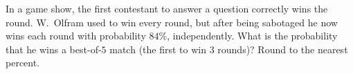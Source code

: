 In a game show, the first contestant to answer a question correctly wins the round. W.~Olfram used to win every round, but after being sabotaged he now wins each round with probability $84\%$, independently. What is the probability that he wins a best-of-$5$ match (the first to win $3$ rounds)? Round to the nearest percent.
